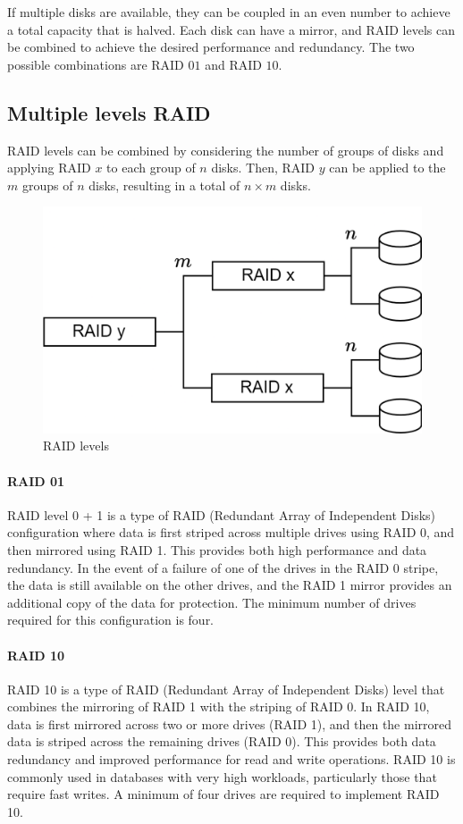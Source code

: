 If multiple disks are available, they can be coupled in an even number to achieve a total capacity that is halved. 
Each disk can have a mirror, and RAID levels can be combined to achieve the desired performance and redundancy. 
The two possible combinations are RAID $01$ and RAID $10$.

\subsection{Multiple levels RAID}
RAID levels can be combined by considering the number of groups of disks and applying RAID $x$ to each group of $n$ disks. 
Then, RAID $y$ can be applied to the $m$ groups of $n$ disks, resulting in a total of $n \times m$ disks.
\begin{figure}[H]
    \centering
    \includegraphics[width=0.5\linewidth]{images/level.png}
    \caption{RAID levels}
\end{figure}

\paragraph*{RAID 01}
RAID level 0 + 1 is a type of RAID (Redundant Array of Independent Disks) configuration where data is first striped across multiple drives using RAID 0, and then mirrored using RAID 1. 
This provides both high performance and data redundancy. 
In the event of a failure of one of the drives in the RAID 0 stripe, the data is still available on the other drives, and the RAID 1 mirror provides an additional copy of the data for protection. 
The minimum number of drives required for this configuration is four.

\paragraph*{RAID 10}
RAID 10 is a type of RAID (Redundant Array of Independent Disks) level that combines the mirroring of RAID 1 with the striping of RAID 0. 
In RAID 10, data is first mirrored across two or more drives (RAID 1), and then the mirrored data is striped across the remaining drives (RAID 0). 
This provides both data redundancy and improved performance for read and write operations.
RAID 10 is commonly used in databases with very high workloads, particularly those that require fast writes.
A minimum of four drives are required to implement RAID 10.


